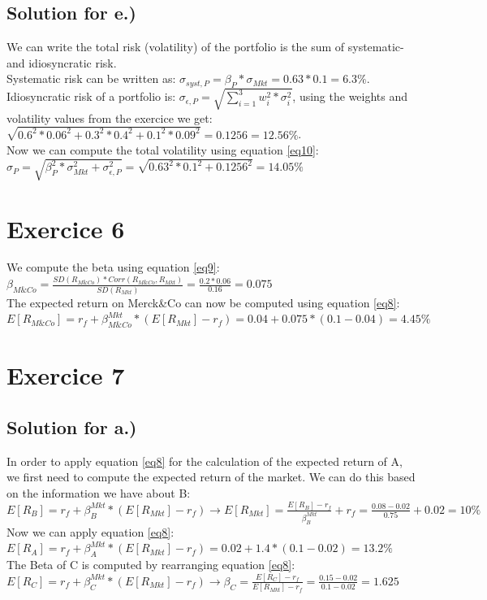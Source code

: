 \documentclass[a4paper,11pt,twoside]{article}
\begin{document}
\subsection{Solution for e.)}
We can write the total risk (volatility) of the portfolio is the sum of systematic- and idiosyncratic risk.\\ Systematic risk can be written as: $\sigma_{syst,P} = \beta_P*\sigma_{Mkt} = 0.63*0.1 = 6.3\%$. \\
Idiosyncratic risk of a portfolio is: $\sigma_{\epsilon,P} = \sqrt{\sum_{i=1}^3w_i^2*\sigma_i^2}$, using the weights and volatility values from the exercice we get: \\[5pt] $\sqrt{0.6^2*0.06^2+0.3^2*0.4^2+0.1^2*0.09^2} = 0.1256 = 12.56\%$. \\[5pt]
Now we can compute the total volatility using equation \ref{eq10}: \\[5pt]
$\sigma_P = \sqrt{\beta_P^2*\sigma_{Mkt}^2+\sigma_{\epsilon,P}^2} = \sqrt{0.63^2*0.1^2+0.1256^2} = 14.05\% $
\section{Exercice 6}

We compute the beta using equation \ref{eq9}: \\[5pt]$\beta_{M\&Co} = \frac{SD(R_{M\&Co})*Corr(R_{M\&Co},R_{Mkt})}{SD(R_{Mkt})} = \frac{0.2*0.06}{0.16} = 0.075$ \\[5pt]
The expected return on Merck\&Co can now be computed using equation \ref{eq8}: \\
$E[R_{M\&Co}] = r_f + \beta_{M\&Co}^{Mkt}*(E[R_{Mkt}]-r_f) = 0.04+0.075*(0.1-0.04) = 4.45\%$ \\[5pt]

\section{Exercice 7}
\subsection{Solution for a.)}
In order to apply equation \ref{eq8} for the calculation of the expected return of A, we first need to compute the expected return of the market. We can do this based on the information we have about B: \\[5pt]
$E[R_{B}] = r_f + \beta_B^{Mkt}*(E[R_{Mkt}]-r_f) \rightarrow E[R_{Mkt}] = \frac{E[R_B]-r_f}{\beta_B^{Mkt}} + r_f = \frac{0.08-0.02}{0.75}+0.02 = 10\%$\\[5pt]
Now we can apply equation \ref{eq8}: \\[5pt]
$E[R_A] = r_f + \beta_A^{Mkt}*(E[R_{Mkt}]-r_f) = 0.02+1.4*(0.1-0.02) = 13.2\% $\\[5pt]
The Beta of C is computed by rearranging equation \ref{eq8}: \\[5pt]
$E[R_C] = r_f + \beta_C^{Mkt}*(E[R_{Mkt}]-r_f) \rightarrow \beta_C = \frac{E[R_C]-r_f}{E[R_{Mkt}]-r_f} = \frac{0.15-0.02}{0.1-0.02} = 1.625$
\end{document}
